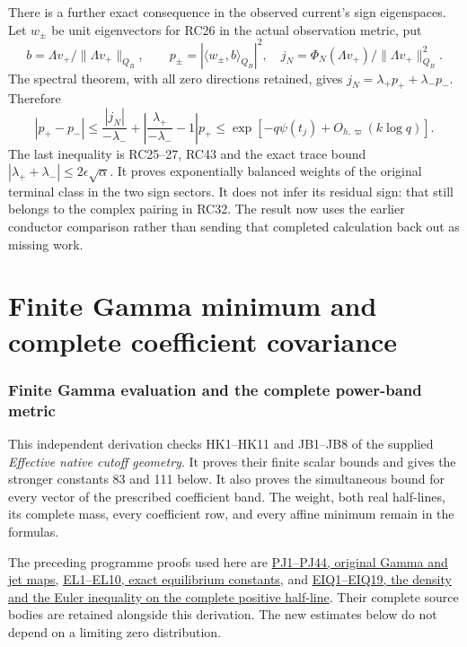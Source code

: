 \documentclass[10pt]{article}
\begin{document}
There is a further exact consequence in the observed current's sign eigenspaces. Let \(w_\pm\) be unit eigenvectors for RC26 in the actual observation metric, put \[
b=\Lambda v_+/\|\Lambda v_+\|_{Q_B},\qquad
p_\pm=|\langle w_\pm,b\rangle_{Q_B}|^2,
\quad j_N=\Phi_N(\Lambda v_+)/\|\Lambda v_+\|_{Q_B}^2.
\] The spectral theorem, with all zero directions retained, gives \(j_N=\lambda_+p_++\lambda_-p_-\). Therefore \[
\boxed{
|p_+-p_-|
\le\frac{|j_N|}{-\lambda_-}
+\left|\frac{\lambda_+}{-\lambda_-}-1\right|p_+
\le\exp[-q\psi(t_j)+O_{h,\varpi}(k\log q)].
}
\tag{RC44}
\] The last inequality is RC25--27, RC43 and the exact trace bound \(|\lambda_++\lambda_-|\le2\epsilon\sqrt\alpha\). It proves exponentially balanced weights of the original terminal class in the two sign sectors. It does not infer its residual sign: that still belongs to the complex pairing in RC32. The result now uses the earlier conductor comparison rather than sending that completed calculation back out as missing work.

\clearpage\part{Finite Gamma minimum and complete coefficient covariance}
\section{Finite Gamma evaluation and the complete power-band metric}\label{finite-gamma-evaluation-and-the-complete-power-band-metric}

This independent derivation checks HK1--HK11 and JB1--JB8 of the supplied \emph{Effective native cutoff geometry}. It proves their finite scalar bounds and gives the stronger constants 83 and 111 below. It also proves the simultaneous bound for every vector of the prescribed coefficient band. The weight, both real half-lines, its complete mass, every coefficient row, and every affine minimum remain in the formulas.

The preceding programme proofs used here are \href{https://github.com/KokunoYumeto/zeta-function-research-reader/blob/1447462732b40b1474bd9a819cf79257f5326ada/workbenches/splitzero-tandem/continuations/20260922-kernel-frequency/POWER_JET_PROOF.md}{PJ1--PJ44, original Gamma and jet maps}, \href{https://github.com/KokunoYumeto/zeta-function-research-reader/blob/1447462732b40b1474bd9a819cf79257f5326ada/workbenches/splitzero-tandem/continuations/20260922-kernel-frequency/ELLIPTIC_LOG_MOMENT_PROOF.md}{EL1--EL10, exact equilibrium constants}, and \href{https://github.com/KokunoYumeto/zeta-function-research-reader/blob/9104d852c6bc5b79e6fc4588c403128a40b7fda3/workbenches/splitzero-tandem/continuations/20260922-arithmetic-probe-mass/RETAINED_COMPLETE_PROOF_SOURCES.tex\#L4384}{EIQ1--EIQ19, the density and the Euler inequality on the complete positive half-line}. Their complete source bodies are retained alongside this derivation. The new estimates below do not depend on a limiting zero distribution.
\end{document}
